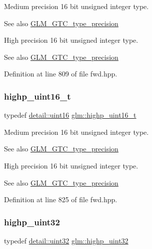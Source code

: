 Medium precision 16 bit unsigned integer type. \begin{DoxySeeAlso}{See also}
\mbox{\hyperlink{group__gtc__type__precision}{G\+L\+M\+\_\+\+G\+T\+C\+\_\+type\+\_\+precision}}
\end{DoxySeeAlso}
High precision 16 bit unsigned integer type. \begin{DoxySeeAlso}{See also}
\mbox{\hyperlink{group__gtc__type__precision}{G\+L\+M\+\_\+\+G\+T\+C\+\_\+type\+\_\+precision}} 
\end{DoxySeeAlso}


Definition at line 809 of file fwd.\+hpp.

\mbox{\label{group__gtc__type__precision_ga3145bc0ee80432c165e985a188a722b3}} 
\subsubsection{\texorpdfstring{highp\_uint16\_t}{highp\_uint16\_t}}
{\footnotesize\ttfamily typedef \mbox{\hyperlink{namespaceglm_1_1detail_a47b2a7d006d187338e8031a352d1ce56}{detail\+::uint16}} \mbox{\hyperlink{group__gtc__type__precision_ga3145bc0ee80432c165e985a188a722b3}{glm\+::highp\+\_\+uint16\+\_\+t}}}

Medium precision 16 bit unsigned integer type. \begin{DoxySeeAlso}{See also}
\mbox{\hyperlink{group__gtc__type__precision}{G\+L\+M\+\_\+\+G\+T\+C\+\_\+type\+\_\+precision}}
\end{DoxySeeAlso}
High precision 16 bit unsigned integer type. \begin{DoxySeeAlso}{See also}
\mbox{\hyperlink{group__gtc__type__precision}{G\+L\+M\+\_\+\+G\+T\+C\+\_\+type\+\_\+precision}} 
\end{DoxySeeAlso}


Definition at line 825 of file fwd.\+hpp.

\mbox{\label{group__gtc__type__precision_ga3145e44c73e2df7dfe4f3cb65974bf22}} 
\subsubsection{\texorpdfstring{highp\_uint32}{highp\_uint32}}
{\footnotesize\ttfamily typedef \mbox{\hyperlink{namespaceglm_1_1detail_ade6cfbf377022aaa391af8cd50489222}{detail\+::uint32}} \mbox{\hyperlink{group__gtc__type__precision_ga3145e44c73e2df7dfe4f3cb65974bf22}{glm\+::highp\+\_\+uint32}}}

